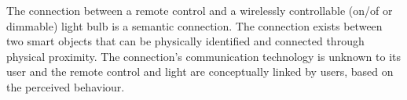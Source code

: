 





The connection between a remote control and a wirelessly controllable (on/of or dimmable) light bulb is a semantic connection. The connection exists between two smart objects that can be physically identified and connected through physical proximity. The connection's communication technology is unknown to its user and the remote control and light are conceptually linked by users, based on the perceived behaviour. 



